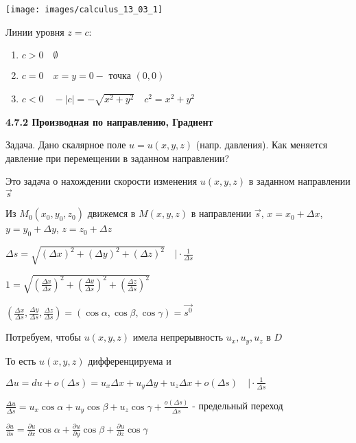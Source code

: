 \documentclass[12pt]{article}
\begin{document}
    \texttt{[image: images/calculus\_13\_03\_1]}

    Линии уровня $z = c$:

    \begin{enumerate}
        \item $c > 0 \quad \emptyset$
        \item $c = 0 \quad x = y = 0 - $ точка $(0, 0)$
        \item $c < 0 \quad -|c| = -\sqrt{x^2 + y^2} \quad c^2 = x^2 + y^2$
    \end{enumerate}

    \vspace{7mm}

    \textbf{4.7.2 Производная по направлению, Градиент}

    Задача. Дано скалярное поле $u = u(x, y, z)$ (напр. давления). Как меняется давление при перемещении в заданном направлении?

    Это задача о нахождении скорости изменения $u(x, y, z)$ в заданном направлении $\overrightarrow{s}$

    Из $M_0(x_0, y_0, z_0)$ движемся в $M(x, y, z)$ в направлении $\overrightarrow{s}$, $x = x_0 + \Delta x$, $y = y_0 + \Delta y$, $z = z_0 + \Delta z$

    $\displaystyle \Delta s = \sqrt{(\Delta x)^2 + (\Delta y)^2 + (\Delta z)^2} \quad \Big| \cdot \frac{1}{\Delta s}$

    $\displaystyle 1 = \sqrt{(\frac{\Delta x}{\Delta s})^2 + (\frac{\Delta y}{\Delta s})^2 + (\frac{\Delta z}{\Delta s})^2}$

    $\displaystyle (\frac{\Delta x}{\Delta s}, \frac{\Delta y}{\Delta s}, \frac{\Delta z}{\Delta s}) = (\cos\alpha, \cos\beta, \cos\gamma) = \overrightarrow{s^0}$

    Потребуем, чтобы $u(x, y, z)$ имела непрерывность $u_x, u_y, u_z$ в $D$

    То есть $u(x, y, z)$ дифференцируема и

    $\displaystyle \Delta u = du + o(\Delta s) = u_x \Delta x + u_y \Delta y + u_z \Delta x + o(\Delta s) \quad \Big| \cdot \frac{1}{\Delta s}$

    $\displaystyle \frac{\Delta u}{\Delta s} = u_x \cos\alpha + u_y \cos\beta + u_z \cos\gamma + \frac{o(\Delta s)}{\Delta s}$ - предельный переход

    $\displaystyle \frac{\partial u}{\partial s} = \frac{\partial u}{\partial x} \cos\alpha + \frac{\partial u}{\partial y} \cos\beta + \frac{\partial u}{\partial z} \cos\gamma$
\end{document}
